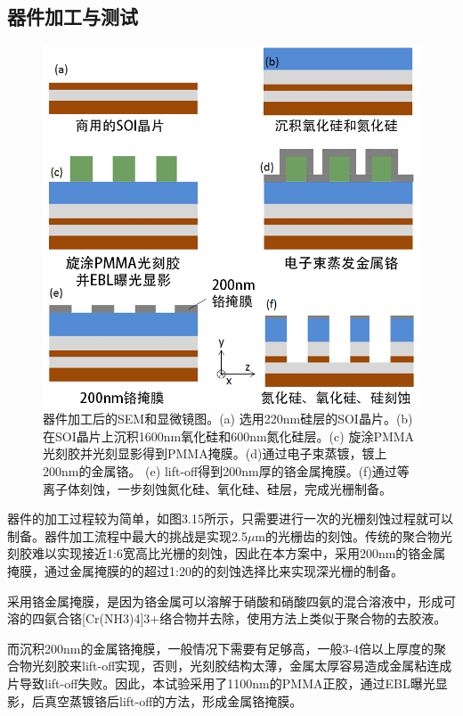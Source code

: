 \subsection{器件加工与测试}

\begin{figure}[!htbp]
    \centering
    \includegraphics[width=1\textwidth]{Img/3-15.png}
    \caption{器件加工后的SEM和显微镜图。(a) 选用220nm硅层的SOI晶片。(b)在SOI晶片上沉积1600nm氧化硅和600nm氮化硅层。(c) 旋涂PMMA光刻胶并光刻显影得到PMMA掩膜。(d)通过电子束蒸镀，镀上200nm的金属铬。 (e) lift-off得到200nm厚的铬金属掩膜。(f)通过等离子体刻蚀，一步刻蚀氮化硅、氧化硅、硅层，完成光栅制备。}
    \label{fig:3-15}
\end{figure}

器件的加工过程较为简单，如图3.15所示，只需要进行一次的光栅刻蚀过程就可以制备。器件加工流程中最大的挑战是实现2.5$\mu$m的光栅齿的刻蚀。传统的聚合物光刻胶难以实现接近1:6宽高比光栅的刻蚀，因此在本方案中，采用200nm的铬金属掩膜，通过金属掩膜的的超过1:20的的刻蚀选择比来实现深光栅的制备。

采用铬金属掩膜，是因为铬金属可以溶解于硝酸和硝酸四氨的混合溶液中，形成可溶的四氨合铬[Cr(NH3)4]3+络合物并去除，使用方法上类似于聚合物的去胶液。\cite{chromium}

而沉积200nm的金属铬掩膜，一般情况下需要有足够高，一般3-4倍以上厚度的聚合物光刻胶来lift-off实现，否则，光刻胶结构太薄，金属太厚容易造成金属粘连成片导致lift-off失败。因此，本试验采用了1100nm的PMMA正胶，通过EBL曝光显影，后真空蒸镀铬后lift-off的方法，形成金属铬掩膜。


